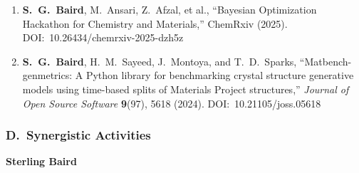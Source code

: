 \documentclass[11pt,letterpaper]{article}
\begin{document}
\begin{enumerate}[leftmargin=*]
\item \textbf{S.\ G.\ Baird}, M.\ Ansari, Z.\ Afzal, et al.,
  ``Bayesian Optimization Hackathon for Chemistry and Materials,''
  ChemRxiv (2025).
  DOI:~10.26434/chemrxiv-2025-dzh5z

\item \textbf{S.\ G.\ Baird}, H.\ M.\ Sayeed, J.\ Montoya, and T.\ D.\ Sparks,
  ``Matbench-genmetrics: A Python library for benchmarking crystal structure
  generative models using time-based splits of Materials Project structures,''
  \textit{Journal of Open Source Software} \textbf{9}(97), 5618 (2024).
  DOI:~10.21105/joss.05618
\end{enumerate}

\subsubsection*{D.\ Synergistic Activities}

\textbf{Sterling Baird}
\end{document}
